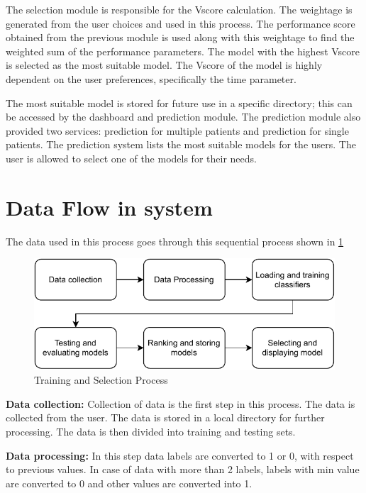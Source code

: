 The selection module is responsible for the Vscore calculation. The weightage is generated from the user choices and used in this process. The performance score obtained from the previous module is used along with this weightage to find the weighted sum of the performance parameters. The model with the highest Vscore is selected as the most suitable model. The Vscore of the model is highly dependent on the user preferences, specifically the time parameter.

The most suitable model is stored for future use in a specific directory; this can be accessed by the dashboard and prediction module. The prediction module also provided two services: prediction for multiple patients and prediction for single patients. The prediction system lists the most suitable models for the users. The user is allowed to select one of the models for their needs.

\section{Data Flow in system}

The data used in this process goes through this sequential process shown in \cref{fig:data_flow_in_system}

\begin{figure}[H]
  \centering
  \includegraphics[width=0.7\columnwidth]{media/website/architecture/Data_Flow_System.pdf}
  \caption{Training and Selection Process}
  \label{fig:data_flow_in_system}
\end{figure}

\textbf{Data collection:} Collection of data is the first step in this process. The data is collected from the user. The data is stored in a local directory for further processing. The data is then divided into training and testing sets.

\vspace{-0.5em}
\textbf{Data processing:} In this step data labels are converted to 1 or 0, with respect to previous values. In case of data with more than 2 labels, labels with min value are converted to 0 and other values are converted into 1.

